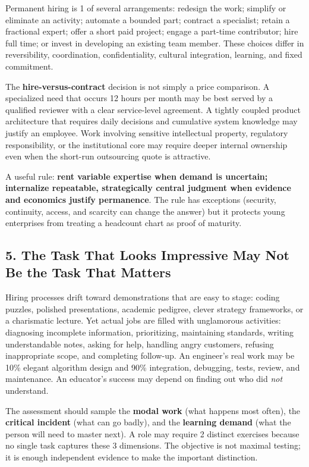 Permanent hiring is 1 of several arrangements: redesign the work; simplify or eliminate an activity; automate a bounded part; contract a specialist; retain a fractional expert; offer a short paid project; engage a part-time contributor; hire full time; or invest in developing an existing team member. These choices differ in reversibility, coordination, confidentiality, cultural integration, learning, and fixed commitment.

The \textbf{hire-versus-contract} decision is not simply a price comparison. A specialized need that occurs 12 hours per month may be best served by a qualified reviewer with a clear service-level agreement. A tightly coupled product architecture that requires daily decisions and cumulative system knowledge may justify an employee. Work involving sensitive intellectual property, regulatory responsibility, or the institutional core may require deeper internal ownership even when the short-run outsourcing quote is attractive.

A useful rule: \textbf{rent variable expertise when demand is uncertain; internalize repeatable, strategically central judgment when evidence and economics justify permanence}. The rule has exceptions (security, continuity, access, and scarcity can change the answer) but it protects young enterprises from treating a headcount chart as proof of maturity.

\subsection*{5. The Task That Looks Impressive May Not Be the Task That Matters}

Hiring processes drift toward demonstrations that are easy to stage: coding puzzles, polished presentations, academic pedigree, clever strategy frameworks, or a charismatic lecture. Yet actual jobs are filled with unglamorous activities: diagnosing incomplete information, prioritizing, maintaining standards, writing understandable notes, asking for help, handling angry customers, refusing inappropriate scope, and completing follow-up. An engineer's real work may be 10\% elegant algorithm design and 90\% integration, debugging, tests, review, and maintenance. An educator's success may depend on finding out who did \textit{not} understand.

The assessment should sample the \textbf{modal work} (what happens most often), the \textbf{critical incident} (what can go badly), and the \textbf{learning demand} (what the person will need to master next). A role may require 2 distinct exercises because no single task captures these 3 dimensions. The objective is not maximal testing; it is enough independent evidence to make the important distinction.

